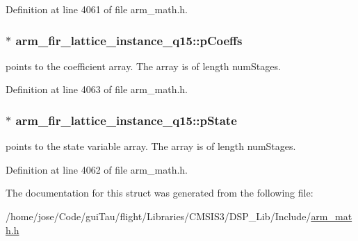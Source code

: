 Definition at line 4061 of file arm\-\_\-math.\-h.

\hypertarget{structarm__fir__lattice__instance__q15_a78f872826140069cf67836fff87360bc}{
\subsubsection[{p\-Coeffs}]{$\ast$ arm\-\_\-fir\-\_\-lattice\-\_\-instance\-\_\-q15\-::p\-Coeffs}}\label{structarm__fir__lattice__instance__q15_a78f872826140069cf67836fff87360bc}
points to the coefficient array. The array is of length num\-Stages. 

Definition at line 4063 of file arm\-\_\-math.\-h.

\hypertarget{structarm__fir__lattice__instance__q15_a37b90dea2bc3ee7c9951a9fe74db0cbb}{
\subsubsection[{p\-State}]{$\ast$ arm\-\_\-fir\-\_\-lattice\-\_\-instance\-\_\-q15\-::p\-State}}\label{structarm__fir__lattice__instance__q15_a37b90dea2bc3ee7c9951a9fe74db0cbb}
points to the state variable array. The array is of length num\-Stages. 

Definition at line 4062 of file arm\-\_\-math.\-h.



The documentation for this struct was generated from the following file\-:\begin{DoxyCompactItemize}
\item 
/home/jose/\-Code/gui\-Tau/flight/\-Libraries/\-C\-M\-S\-I\-S3/\-D\-S\-P\-\_\-\-Lib/\-Include/\hyperlink{arm__math_8h}{arm\-\_\-math.\-h}\end{DoxyCompactItemize}
